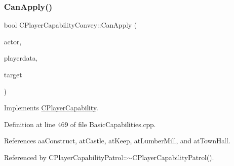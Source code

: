 \subsubsection{\texorpdfstring{Can\+Apply()}{CanApply()}}
{\footnotesize\ttfamily bool C\+Player\+Capability\+Convey\+::\+Can\+Apply (\begin{DoxyParamCaption}\item[{std\+::shared\+\_\+ptr$<$ \hyperlink{classCPlayerAsset}{C\+Player\+Asset} $>$}]{actor,  }\item[{std\+::shared\+\_\+ptr$<$ \hyperlink{classCPlayerData}{C\+Player\+Data} $>$}]{playerdata,  }\item[{std\+::shared\+\_\+ptr$<$ \hyperlink{classCPlayerAsset}{C\+Player\+Asset} $>$}]{target }\end{DoxyParamCaption})\hspace{0.3cm}{\ttfamily [virtual]}}



Implements \hyperlink{classCPlayerCapability_ae96263e0950f496492f8baeb877b9554}{C\+Player\+Capability}.



Definition at line 469 of file Basic\+Capabilities.\+cpp.



References aa\+Construct, at\+Castle, at\+Keep, at\+Lumber\+Mill, and at\+Town\+Hall.



Referenced by C\+Player\+Capability\+Patrol\+::$\sim$\+C\+Player\+Capability\+Patrol().


